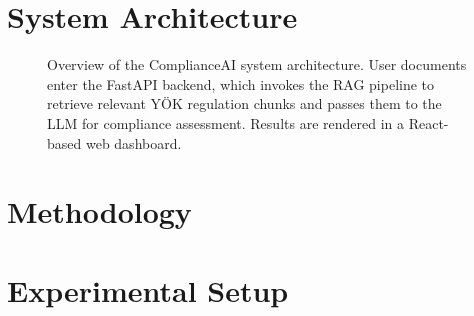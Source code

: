 \documentclass[a4paper,fleqn]{cas-dc}
\begin{document}
\section{System Architecture}
\label{sec:architecture}


\begin{figure}[h]
  \centering
  \caption{Overview of the ComplianceAI system architecture. User documents
    enter the FastAPI backend, which invokes the RAG pipeline to retrieve
    relevant YÖK regulation chunks and passes them to the LLM for compliance
    assessment. Results are rendered in a React-based web dashboard.}
  \label{fig:architecture}
\end{figure}

\section{Methodology}
\label{sec:methodology}


\section{Experimental Setup}
\label{sec:setup}

\end{document}

